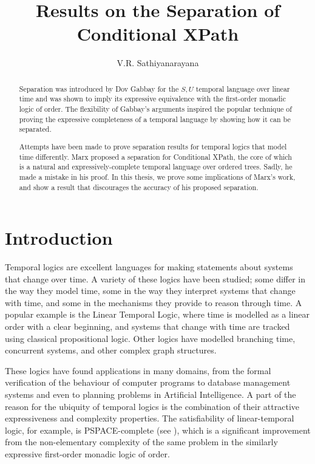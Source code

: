 \documentclass[a4paper,UKenglish,cleveref, autoref, thm-restate, numberwithinsect]{lipics-v2021}
\title{Results on the Separation of Conditional XPath} %
\author{V.R. Sathiyanarayana}{Chennai Mathematical Institute, India \and \url{http://sathiyavrs.netlify.app}}{sathiyanarayana@cmi.ac.in}{}{}%
\begin{document}
\maketitle

\begin{abstract}
    Separation was introduced by Dov Gabbay for the $S, U$ temporal language over linear time and was shown to imply its expressive equivalence with the first-order monadic logic of order. The flexibility of Gabbay's arguments inspired the popular technique of proving the expressive completeness of a temporal language by showing how it can be separated.

    Attempts have been made to prove separation results for temporal logics that model time differently. Marx proposed a separation for Conditional XPath, the core of which is a natural and expressively-complete temporal language over ordered trees. Sadly, he made a mistake in his proof. In this thesis, we prove some implications of Marx's work, and show a result that discourages the accuracy of his proposed separation.
\end{abstract}

\section{Introduction}
\label{sec:introduction}

Temporal logics are excellent languages for making statements about systems that change over time. A variety of these logics have been studied; some differ in the way they model time, some in the way they interpret systems that change with time, and some in the mechanisms they provide to reason through time. A popular example is the Linear Temporal Logic, where time is modelled as a linear order with a clear beginning, and systems that change with time are tracked using classical propositional logic. Other logics have modelled branching time, concurrent systems, and other complex graph structures.

These logics have found applications in many domains, from the formal verification of the behaviour of computer programs to database management systems and even to planning problems in Artificial Intelligence. A part of the reason for the ubiquity of temporal logics is the combination of their attractive expressiveness and complexity properties. The satisfiability of linear-temporal logic, for example, is PSPACE-complete (see \cite{vardiLTL}), which is a significant improvement from the non-elementary complexity of the same problem in the similarly expressive first-order monadic logic of order.
\end{document}
